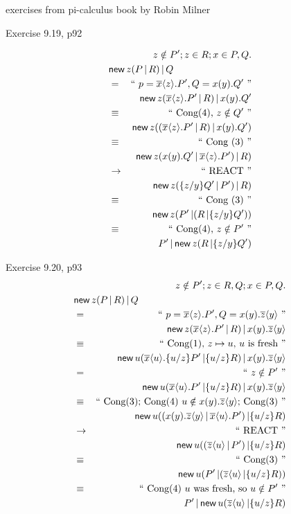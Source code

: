 \documentclass{article}
\def\new{\mathop{\mathsf{new}}}
\def\bar#1{\overline{#1}}
\def\ang#1{\langle{#1}\rangle}
\def\outp#1#2{\bar{#1}\ang{#2}}
\def\inp#1#2{#1(#2)}
\def\comp{\mathop{|}}
\def\subst#1#2{\{{#1}/{#2}\}}
\def\cong{\equiv}
\def\trans{\rightarrow}
\def\coz#1{\textrm{``~#1~''}}
\def\cozm#1{\textrm{``~}#1\textrm{~''}}
\begin{document}
exercises from pi-calculus book by Robin Milner

Exercise 9.19, p92


\begin{eqnarray*}
  && z \notin P'; z \in R; x \in P,Q.
\\ \lefteqn{\new z (P \comp R) \comp Q}
\\ &=& \cozm{p = \outp x z . P', Q = \inp x y.Q'}
\\ && \new z (\outp x z . P' \comp R) \comp  \inp x y.Q'
\\ &\cong& \coz{Cong(4), $z \notin Q'$}
\\ && \new z ((\outp x z . P' \comp R) \comp  \inp x y.Q')
\\ &\cong& \coz{Cong (3)}
\\ && \new z (\inp x y.Q' \comp \outp x z . P') \comp R)
\\ &\trans& \coz{REACT}
\\ && \new z (\subst z y Q' \comp P') \comp R)
\\ &\cong& \coz{Cong (3)}
\\ && \new z (P' \comp (R \comp \subst z y Q'))
\\ &\cong& \coz{Cong(4), $z \notin P'$}
\\ && P' \comp \new z (R \comp \subst z y Q')
\end{eqnarray*}

Exercise 9.20, p93
\begin{eqnarray*}
  && z \notin P'; z \in R,Q; x \in P,Q.
\\ \lefteqn{\new z (P \comp R) \comp Q}
\\ &=& \cozm{p = \outp x z . P', Q = \inp x y.\outp z y}
\\ && \new z (\outp x z . P' \comp R) \comp \inp x y.\outp z y
\\ &\cong& \coz{Cong(1), $z \mapsto u$, $u$ is fresh}
\\ && \new u (\outp x u . \subst u z P' \comp \subst u z R) \comp \inp x y.\outp z y
\\ &=& \cozm{z \notin P'}
\\ && \new u (\outp x u . P' \comp \subst u z R) \comp \inp x y.\outp z y
\\ &\cong& \coz{Cong(3); Cong(4) $u \notin \inp x y.\outp z y$; Cong(3)}
\\ && \new u ((\inp x y.\outp z y \comp \outp x u . P') \comp \subst u z R)
\\ &\trans& \coz{REACT}
\\ && \new u ((\outp z u \comp P') \comp \subst u z R)
\\ &\cong& \coz{Cong(3)}
\\ && \new u (P' \comp (\outp z u \comp \subst u z R))
\\ &\cong& \coz{Cong(4) $u$ was fresh, so $u \notin P'$}
\\ && P' \comp \new u (\outp z u \comp \subst u z R)
\end{eqnarray*}
\end{document}
